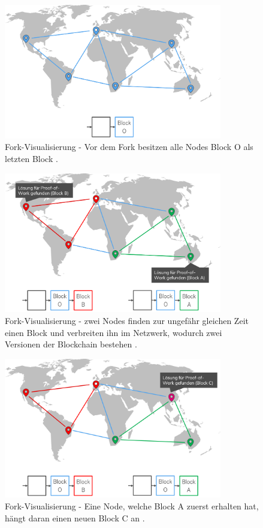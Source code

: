 \begin{figure}[!htbp]
  \centering
    \includegraphics[width=0.85\textwidth,angle=0]{images/fork_1}
 	\caption{Fork-Visualisierung - Vor dem Fork besitzen alle Nodes Block O als letzten Block \cite[S.~200 ff.]{AntonopoulosMasteringbitcoin2015}.}
	\label{fig:fork_1}
\end{figure}

\begin{figure}[!htbp]
  \centering
	\includegraphics[width=0.85\textwidth,angle=0]{images/fork_2}
 	\caption{Fork-Visualisierung - zwei Nodes finden zur ungefähr gleichen Zeit einen Block und verbreiten ihn im Netzwerk, wodurch zwei Versionen der Blockchain bestehen \cite[S.~200 ff.]{AntonopoulosMasteringbitcoin2015}.}
	\label{fig:fork_2}
\end{figure}

\begin{figure}[!htbp]
  \centering
	\includegraphics[width=0.85\textwidth,angle=0]{images/fork_3}
 	\caption{Fork-Visualisierung - Eine Node, welche Block A zuerst erhalten hat, hängt daran einen neuen Block C an \cite[S.~200 ff.]{AntonopoulosMasteringbitcoin2015}.}
	\label{fig:fork_3}
\end{figure}


